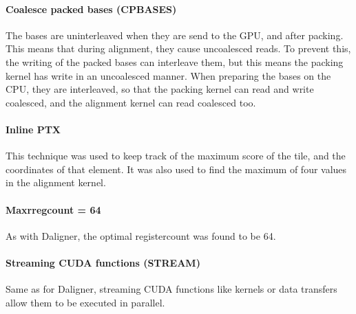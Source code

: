 \documentclass[../main/thesis.tex]{subfiles}
\begin{document}
\paragraph{Coalesce packed bases (CPBASES)}
The bases are uninterleaved when they are send to the GPU, and after packing.
This means that during alignment, they cause uncoalesced reads.
To prevent this, the writing of the packed bases can interleave them, but this means the packing kernel has write in an uncoalesced manner.
When preparing the bases on the CPU, they are interleaved, so that the packing kernel can read and write coalesced, and the alignment kernel can read coalesced too.

\paragraph{Inline PTX}
This technique was used to keep track of the maximum score of the tile, and the coordinates of that element.
It was also used to find the maximum of four values in the alignment kernel.

\paragraph{Maxrregcount = 64}
As with Daligner, the optimal registercount was found to be 64.

\paragraph{Streaming CUDA functions (STREAM)}
Same as for Daligner, streaming CUDA functions like kernels or data transfers allow them to be executed in parallel.
\end{document}
